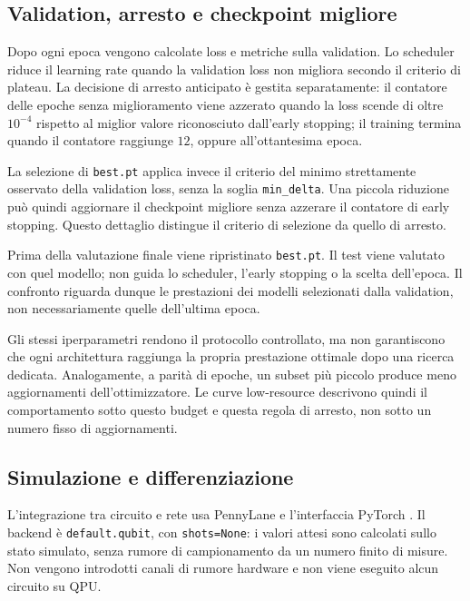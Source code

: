 \subsection{Validation, arresto e checkpoint migliore}

Dopo ogni epoca vengono calcolate loss e metriche sulla validation.
Lo scheduler riduce il learning rate quando la validation loss
non migliora secondo il criterio di plateau. La decisione di arresto
anticipato è gestita separatamente: il contatore delle epoche senza
miglioramento viene azzerato quando la loss scende di oltre \(10^{-4}\)
rispetto al miglior valore riconosciuto dall'early stopping; il training
termina quando il contatore raggiunge \(12\), oppure all'ottantesima epoca.

La selezione di \texttt{best.pt} applica invece il criterio del minimo
strettamente osservato della validation loss, senza la soglia
\texttt{min\_delta}. Una piccola riduzione può quindi aggiornare il
checkpoint migliore senza azzerare il contatore di early stopping.
Questo dettaglio distingue il criterio di selezione da quello di arresto.

Prima della valutazione finale viene ripristinato \texttt{best.pt}.
Il test viene valutato con quel modello; non guida lo scheduler,
l'early stopping o la scelta dell'epoca. Il confronto riguarda dunque
le prestazioni dei modelli selezionati dalla validation, non
necessariamente quelle dell'ultima epoca.

Gli stessi iperparametri rendono il protocollo controllato, ma non
garantiscono che ogni architettura raggiunga la propria prestazione
ottimale dopo una ricerca dedicata. Analogamente, a parità di epoche,
un subset più piccolo produce meno aggiornamenti dell'ottimizzatore.
Le curve low-resource descrivono quindi il comportamento sotto
questo budget e questa regola di arresto, non sotto un numero fisso
di aggiornamenti.

\subsection{Simulazione e differenziazione}

L'integrazione tra circuito e rete usa PennyLane
\cite{bergholm2018pennylane} e l'interfaccia PyTorch
\cite{paszke2019pytorch}. Il backend è
\texttt{default.qubit}, con \texttt{shots=None}: i valori attesi
sono calcolati sullo stato simulato, senza rumore di campionamento
da un numero finito di misure. Non vengono introdotti canali di rumore
hardware e non viene eseguito alcun circuito su QPU.


